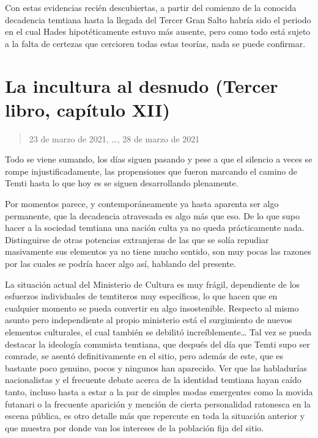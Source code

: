 \documentclass[
]{book}
\begin{document}
Con estas evidencias recién descubiertas, a partir del comienzo de la conocida decadencia temtiana hasta la llegada del Tercer Gran Salto habría sido el periodo en el cual Hades hipotéticamente estuvo más ausente, pero como todo está sujeto a la falta de certezas que cercioren todas estas teorías, nada se puede confirmar.

\hypertarget{la-incultura-al-desnudo-tercer-libro-capuxedtulo-xii}{%
\section{La incultura al desnudo (Tercer libro, capítulo XII)}\label{la-incultura-al-desnudo-tercer-libro-capuxedtulo-xii}}

\begin{quote}
23 de marzo de 2021, \ldots, 28 de marzo de 2021
\end{quote}

Todo se viene sumando, los días siguen pasando y pese a que el silencio a veces se rompe injustificadamente, las propensiones que fueron marcando el camino de Temti hasta lo que hoy es se siguen desarrollando plenamente.

Por momentos parece, y contemporáneamente ya hasta aparenta ser algo permanente, que la decadencia atravesada es algo más que eso. De lo que supo hacer a la sociedad temtiana una nación culta ya no queda prácticamente nada. Distinguirse de otras potencias extranjeras de las que se solía repudiar masivamente sus elementos ya no tiene mucho sentido, son muy pocas las razones por las cuales se podría hacer algo así, hablando del presente.

La situación actual del Ministerio de Cultura es muy frágil, dependiente de los esfuerzos individuales de temtiteros muy específicos, lo que hacen que en cualquier momento se pueda convertir en algo insostenible. Respecto al mismo asunto pero independiente al propio ministerio está el surgimiento de nuevos elementos culturales, el cual también se debilitó increíblemente\ldots{} Tal vez se pueda destacar la ideología comunista temtiana, que después del día que Temti supo ser comrade, se asentó definitivamente en el sitio, pero además de este, que es bastante poco genuino, pocos y ningunos han aparecido. Ver que las habladurías nacionalistas y el frecuente debate acerca de la identidad temtiana hayan caído tanto, incluso hasta a estar a la par de simples modas emergentes como la movida futanari o la frecuente aparición y mención de cierta personalidad ratonesca en la escena pública, es otro detalle más que repercute en toda la situación anterior y que muestra por donde van los intereses de la población fija del sitio.
\end{document}
